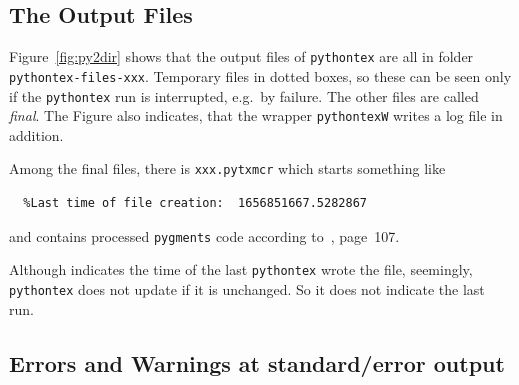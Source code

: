 \documentclass[a4paper, english]{article}%
\newcommand{\pytex}{\texttt{pythontex}}
\begin{document}


\subsection{The Output Files}\label{subsec:pytexOutFile}

  Figure~\ref{fig:py2dir} shows that the output files of \pytex{} 
  are all in folder \texttt{pythontex-files-xxx}. 
  Temporary files in dotted boxes, 
  so these can be seen only if the \pytex{} run is interrupted, e.g.~by failure. 
  The other files are called \emph{final}. 
  The Figure also indicates, that the wrapper \texttt{pythontexW} writes a log file in addition. 
  
  Among the final files, there is \texttt{xxx.pytxmcr} 
  which starts something like 
%
\begin{lstlisting}
  %Last time of file creation:  1656851667.5282867
\end{lstlisting}
%
and contains processed \texttt{pygments} code according to~\cite{PythonTexP}, page~107. 

  Although indicates the time of the last \pytex{} wrote the file, 
  seemingly, \pytex{} does not update if it is unchanged. 
  So it does not indicate the last run. %


\subsection{Errors and Warnings at standard/error output}\label{subsec:pytexErrWarn}
\end{document}
